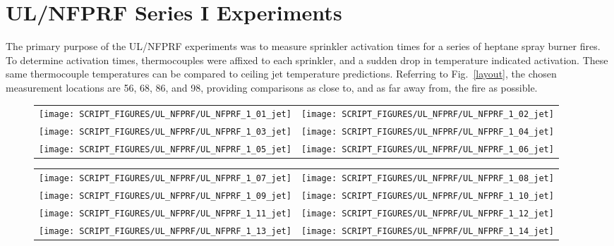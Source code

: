 \clearpage

\section{UL/NFPRF Series I Experiments}

The primary purpose of the UL/NFPRF experiments was to measure sprinkler activation times for a series of heptane spray burner fires. To determine activation times, thermocouples were affixed to each sprinkler, and a sudden drop in temperature indicated activation. These same thermocouple temperatures can be compared to ceiling jet temperature predictions. Referring to Fig.~\ref{layout}, the chosen measurement locations are 56, 68, 86, and 98, providing comparisons as close to, and as far away from, the fire as possible.


\begin{figure}[h!]
\begin{tabular*}{\textwidth}{l@{\extracolsep{\fill}}r}
\texttt{[image: SCRIPT\_FIGURES/UL\_NFPRF/UL\_NFPRF\_1\_01\_jet]} &
\texttt{[image: SCRIPT\_FIGURES/UL\_NFPRF/UL\_NFPRF\_1\_02\_jet]} \\
\texttt{[image: SCRIPT\_FIGURES/UL\_NFPRF/UL\_NFPRF\_1\_03\_jet]} &
\texttt{[image: SCRIPT\_FIGURES/UL\_NFPRF/UL\_NFPRF\_1\_04\_jet]} \\
\texttt{[image: SCRIPT\_FIGURES/UL\_NFPRF/UL\_NFPRF\_1\_05\_jet]} &
\texttt{[image: SCRIPT\_FIGURES/UL\_NFPRF/UL\_NFPRF\_1\_06\_jet]}
\end{tabular*}
\label{UL_NFPRF_jet_1}
\end{figure}

\newpage

\begin{figure}[p]
\begin{tabular*}{\textwidth}{l@{\extracolsep{\fill}}r}
\texttt{[image: SCRIPT\_FIGURES/UL\_NFPRF/UL\_NFPRF\_1\_07\_jet]} &
\texttt{[image: SCRIPT\_FIGURES/UL\_NFPRF/UL\_NFPRF\_1\_08\_jet]} \\
\texttt{[image: SCRIPT\_FIGURES/UL\_NFPRF/UL\_NFPRF\_1\_09\_jet]} &
\texttt{[image: SCRIPT\_FIGURES/UL\_NFPRF/UL\_NFPRF\_1\_10\_jet]} \\
\texttt{[image: SCRIPT\_FIGURES/UL\_NFPRF/UL\_NFPRF\_1\_11\_jet]} &
\texttt{[image: SCRIPT\_FIGURES/UL\_NFPRF/UL\_NFPRF\_1\_12\_jet]} \\
\texttt{[image: SCRIPT\_FIGURES/UL\_NFPRF/UL\_NFPRF\_1\_13\_jet]} &
\texttt{[image: SCRIPT\_FIGURES/UL\_NFPRF/UL\_NFPRF\_1\_14\_jet]}
\end{tabular*}
\label{UL_NFPRF_jet_2}
\end{figure}


